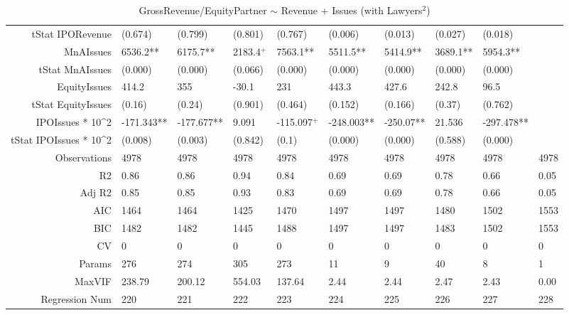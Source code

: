 \begin{table}[ht]
\begin{tabular}{rlllllllll}
  tStat IPORevenue & (0.674) & (0.799) & (0.801) & (0.767) & (0.006) & (0.013) & (0.027) & (0.018) &  \\ 
  MnAIssues & 6536.2** & 6175.7** & 2183.4$^{+}$ & 7563.1** & 5511.5** & 5414.9** & 3689.1** & 5954.3** &  \\ 
  tStat MnAIssues & (0.000) & (0.000) & (0.066) & (0.000) & (0.000) & (0.000) & (0.000) & (0.000) &  \\ 
  EquityIssues & 414.2 & 355 & -30.1 & 231 & 443.3 & 427.6 & 242.8 & 96.5 &  \\ 
  tStat EquityIssues & (0.16) & (0.24) & (0.901) & (0.464) & (0.152) & (0.166) & (0.37) & (0.762) &  \\ 
  IPOIssues * 10^2 & -171.343** & -177.677** & 9.091 & -115.097$^{+}$ & -248.003** & -250.07** & 21.536 & -297.478** &  \\ 
  tStat IPOIssues * 10^2 & (0.008) & (0.003) & (0.842) & (0.1) & (0.000) & (0.000) & (0.588) & (0.000) &  \\ 
  Observations & 4978 & 4978 & 4978 & 4978 & 4978 & 4978 & 4978 & 4978 & 4978 \\ 
  R2 & 0.86 & 0.86 & 0.94 & 0.84 & 0.69 & 0.69 & 0.78 & 0.66 & 0.05 \\ 
  Adj R2 & 0.85 & 0.85 & 0.93 & 0.83 & 0.69 & 0.69 & 0.78 & 0.66 & 0.05 \\ 
  AIC & 1464 & 1464 & 1425 & 1470 & 1497 & 1497 & 1480 & 1502 & 1553 \\ 
  BIC & 1482 & 1482 & 1445 & 1488 & 1497 & 1497 & 1483 & 1502 & 1553 \\ 
  CV & 0 & 0 & 0 & 0 & 0 & 0 & 0 & 0 & 0 \\ 
  Params & 276 & 274 & 305 & 273 & 11 & 9 & 40 & 8 & 1 \\ 
  MaxVIF & 238.79 & 200.12 & 554.03 & 137.64 & 2.44 & 2.44 & 2.47 & 2.43 & 0.00 \\ 
  Regression Num & 220 & 221 & 222 & 223 & 224 & 225 & 226 & 227 & 228 \\ 
   \hline
\end{tabular}
\caption{GrossRevenue/EquityPartner $\sim$ Revenue + Issues (with Lawyers$^2$)} 
\end{table}
